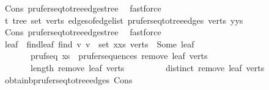 \begin{isabellebody}
\ Cons{\isacharparenleft}{\kern0pt}{}{\isacharparenright}{\kern0pt}\ prufer{\isacharunderscore}{\kern0pt}seq{\isacharunderscore}{\kern0pt}to{\isacharunderscore}{\kern0pt}tree{\isacharunderscore}{\kern0pt}edges{\isacharunderscore}{\kern0pt}tree\ \isamarkupfalse%
\ fastforce\isanewline
\ \ \ \ \isamarkupfalse%
\ t{}{\isacharcolon}{\kern0pt}\ tree\ {\isachardoublequoteopen}set\ verts{\isachardoublequoteclose}\ {\isachardoublequoteopen}edges{\isacharunderscore}{\kern0pt}of{\isacharunderscore}{\kern0pt}edge{\isacharunderscore}{\kern0pt}list\ {\isacharparenleft}{\kern0pt}prufer{\isacharunderscore}{\kern0pt}seq{\isacharunderscore}{\kern0pt}to{\isacharunderscore}{\kern0pt}tree{\isacharunderscore}{\kern0pt}edges\ verts\ {\isacharparenleft}{\kern0pt}y{\isacharhash}{\kern0pt}ys{\isacharparenright}{\kern0pt}{\isacharparenright}{\kern0pt}{\isachardoublequoteclose}\ \isamarkupfalse%
\ Cons{\isacharparenleft}{\kern0pt}{}{\isacharparenright}{\kern0pt}\ prufer{\isacharunderscore}{\kern0pt}seq{\isacharunderscore}{\kern0pt}to{\isacharunderscore}{\kern0pt}tree{\isacharunderscore}{\kern0pt}edges{\isacharunderscore}{\kern0pt}tree\ \isamarkupfalse%
\ fastforce\isanewline
\ \ \ \ \isamarkupfalse%
\ leaf\ \ find{\isacharunderscore}{\kern0pt}leaf{\isacharcolon}{\kern0pt}\ {\isachardoublequoteopen}find\ {\isacharparenleft}{\kern0pt}{\isasymlambda}v{\isachardot}{\kern0pt}\ v\ {\isasymnotin}\ set\ {\isacharparenleft}{\kern0pt}x{\isacharhash}{\kern0pt}xs{\isacharparenright}{\kern0pt}{\isacharparenright}{\kern0pt}\ verts\ {\isacharequal}{\kern0pt}\ Some\ leaf{\isachardoublequoteclose}\isanewline
\ \ \ \ \ \ \ pruf{\isacharunderscore}{\kern0pt}seq{}{\isacharprime}{\kern0pt}{\isacharcolon}{\kern0pt}\ {\isachardoublequoteopen}xs\ {\isasymin}\ prufer{\isacharunderscore}{\kern0pt}sequences\ {\isacharparenleft}{\kern0pt}remove{}\ leaf\ verts{\isacharparenright}{\kern0pt}{\isachardoublequoteclose}\isanewline
\ \ \ \ \ \ \ {\isachardoublequoteopen}length\ {\isacharparenleft}{\kern0pt}remove{}\ leaf\ verts{\isacharparenright}{\kern0pt}\ {\isasymge}\ {}{\isachardoublequoteclose}\isanewline
\ \ \ \ \ \ \ {\isachardoublequoteopen}distinct\ {\isacharparenleft}{\kern0pt}remove{}\ leaf\ verts{\isacharparenright}{\kern0pt}{\isachardoublequoteclose}\ \isamarkupfalse%
\ obtain{\isacharunderscore}{\kern0pt}b{\isacharunderscore}{\kern0pt}prufer{\isacharunderscore}{\kern0pt}seq{\isacharunderscore}{\kern0pt}to{\isacharunderscore}{\kern0pt}tree{\isacharunderscore}{\kern0pt}edges\ Cons{\isacharparenleft}{\kern0pt}{}{\isacharparenright}{\kern0pt}\ \isamarkupfalse%

\end{isabellebody}

